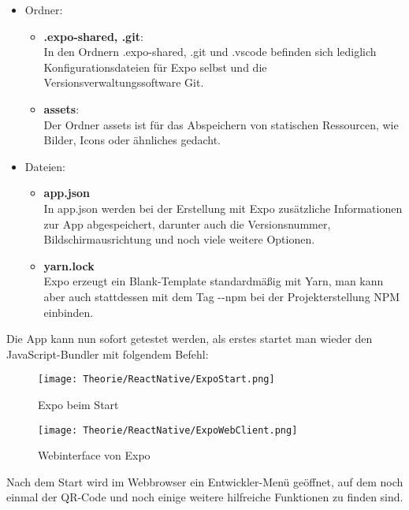 \begin{itemize}
\item Ordner:
  \begin{itemize}
  \item \textbf{.expo-shared, .git}:\\
  In den Ordnern .expo-shared, .git und .vscode befinden sich lediglich Konfigurationsdateien für
  Expo selbst und die Versionsverwaltungssoftware Git.

  \item \textbf{assets}:\\
  Der Ordner assets ist für das Abspeichern von statischen Ressourcen, wie Bilder, Icons oder
  ähnliches gedacht.
  \end{itemize}

\item Dateien:
  \begin{itemize}
  \item \textbf{app.json}\\
  In app.json werden bei der Erstellung mit Expo zusätzliche Informationen zur App abgespeichert,
  darunter auch die Versionsnummer, Bildschirmausrichtung und noch viele weitere Optionen.

  \item \textbf{yarn.lock}\\
  Expo erzeugt ein Blank-Template standardmäßig mit Yarn, man kann aber auch stattdessen mit dem
  Tag -{}-npm bei der Projekterstellung NPM einbinden.
  \end{itemize}
\end{itemize}

Die App kann nun sofort getestet werden, als erstes startet man wieder den JavaScript-Bundler
 mit folgendem Befehl:

\begin{figure}[H]
  \begin{center}
    \texttt{[image: Theorie/ReactNative/ExpoStart.png]}
    \caption{Expo beim Start}
  \end{center}
\end{figure}

\begin{figure}[H]
  \begin{center}
    \texttt{[image: Theorie/ReactNative/ExpoWebClient.png]}
    \caption{Webinterface von Expo}
  \end{center}
\end{figure}

Nach dem Start wird im Webbrowser ein Entwickler-Menü geöffnet, auf dem noch einmal der QR-Code
und noch einige weitere hilfreiche Funktionen zu finden sind.

